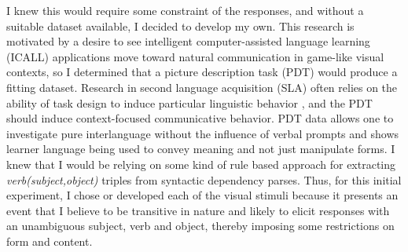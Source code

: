 
%
I knew this would require some constraint of the responses, and without a suitable dataset available, I decided to develop my own. This research is motivated by a desire to see intelligent computer-assisted language learning (ICALL) applications move toward natural communication in game-like visual contexts, so I determined that a picture description task (PDT) would produce a fitting dataset. Research in second language acquisition (SLA) often relies on the
ability of task design to induce particular linguistic behavior
\citep{skehan1998assessing}, and the PDT should induce context-focused
communicative behavior. PDT data allows one to investigate
pure interlanguage without the influence of verbal prompts and shows
learner language being used to convey meaning and not just manipulate forms.
I knew that I would be relying on some kind of rule based approach for extracting \textit{verb(subject,object)} triples from syntactic dependency parses. Thus, for this initial experiment, I chose or developed each of the visual stimuli because it presents an event that I believe to be transitive in nature and likely to elicit responses with an unambiguous subject, verb and
object, thereby imposing some restrictions on form and content.

